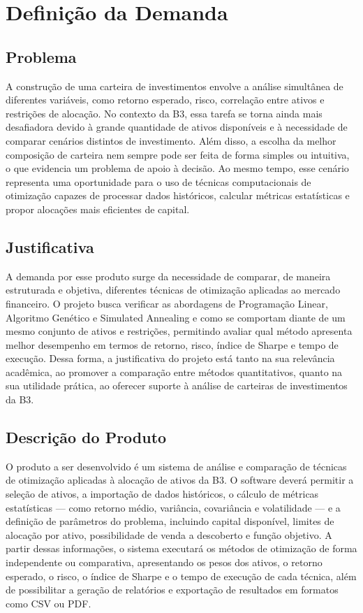 \documentclass[
	12pt,				%
	openright,			%
	oneside,			    %
	a4paper,				%
	english,			%
	french,			%
	spanish,			%
	brazil			%
	]{abntex2}
\begin{document}
\chapter{Definição da Demanda}
\section{Problema}
A construção de uma carteira de investimentos envolve a análise simultânea de diferentes variáveis, como retorno esperado, risco, correlação entre ativos e restrições de alocação. No contexto da B3, essa tarefa se torna ainda mais desafiadora devido à grande quantidade de ativos disponíveis e à necessidade de comparar cenários distintos de investimento. Além disso, a escolha da melhor composição de carteira nem sempre pode ser feita de forma simples ou intuitiva, o que evidencia um problema de apoio à decisão. Ao mesmo tempo, esse cenário representa uma oportunidade para o uso de técnicas computacionais de otimização capazes de processar dados históricos, calcular métricas estatísticas e propor alocações mais eficientes de capital.

\section{Justificativa}
A demanda por esse produto surge da necessidade de comparar, de maneira estruturada e objetiva, diferentes técnicas de otimização aplicadas ao mercado financeiro. O projeto busca verificar as abordagens de Programação Linear, Algoritmo Genético e Simulated Annealing e como se comportam diante de um mesmo conjunto de ativos e restrições, permitindo avaliar qual método apresenta melhor desempenho em termos de retorno, risco, índice de Sharpe e tempo de execução. Dessa forma, a justificativa do projeto está tanto na sua relevância acadêmica, ao promover a comparação entre métodos quantitativos, quanto na sua utilidade prática, ao oferecer suporte à análise de carteiras de investimentos da B3.

\section{Descrição do Produto}
O produto a ser desenvolvido é um sistema de análise e comparação de técnicas de otimização aplicadas à alocação de ativos da B3. O software deverá permitir a seleção de ativos, a importação de dados históricos, o cálculo de métricas estatísticas — como retorno médio, variância, covariância e volatilidade — e a definição de parâmetros do problema, incluindo capital disponível, limites de alocação por ativo, possibilidade de venda a descoberto e função objetivo. A partir dessas informações, o sistema executará os métodos de otimização de forma independente ou comparativa, apresentando os pesos dos ativos, o retorno esperado, o risco, o índice de Sharpe e o tempo de execução de cada técnica, além de possibilitar a geração de relatórios e exportação de resultados em formatos como CSV ou PDF.
\end{document}
